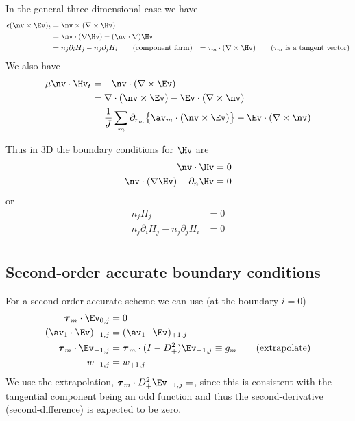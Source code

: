 \documentclass[10pt]{article}
\newcommand{\grad}{\nabla}
\begin{document}
In the general three-dimensional case we have
\begin{align*}
  \eps (\nv\times\Ev)_t &= \nv\times(\grad\times\Hv) \\
                   &= \nv\cdot(\grad\Hv) - (\nv\cdot\grad)\Hv \\
                   &= n_j \partial_i H_j - n_j \partial_j H_i \qquad\mbox{(component form)}
                   &= \tau_m\cdot(\grad\times\Hv) \qquad\mbox{($\tau_m$ is a tangent vector)}
\end{align*}
We also have
\begin{align*}
 \mu \nv\cdot\Hv_t & = -\nv\cdot(\grad\times\Ev) \\
                   &= \grad\cdot(\nv\times\Ev) - \Ev\cdot(\grad\times\nv) \\
                   &= {1\over J}\sum_m \partial_{r_m}\big\{ \av_m\cdot(\nv\times\Ev)\big\}
                                                  - \Ev\cdot(\grad\times\nv) \\
\end{align*}

Thus in 3D the boundary conditions for $\Hv$ are
\begin{align*} 
  \nv\cdot\Hv &= 0 \\
  \nv\cdot(\grad\Hv) - \partial_n \Hv &= 0
\end{align*}
or 
\begin{align*} 
  n_j H_j  &= 0 \\
  n_j \partial_i H_j - n_j \partial_j H_i &= 0 \\
\end{align*}

\subsection{Second-order accurate boundary conditions}

For a second-order accurate scheme we can use (at the boundary $i=0$)
\begin{align*}
    \tauv_m\cdot\Ev_{0,j}  &=0  \\
     (\av_1\cdot\Ev)_{-1,j} &= (\av_1\cdot\Ev)_{+1,j} \\
    \tauv_m\cdot\Ev_{-1,j} &= \tauv_m \cdot (I-D_+^2)\Ev_{-1,j} \equiv g_m   \qquad\mbox{(extrapolate)}\\
     w_{-1,j} &= w_{+1,j}
\end{align*}
We use the extrapolation, $\tauv_m\cdot D_+^2\Ev_{-1,j}=$, since this is consistent with the
tangential component being an odd function and thus the second-derivative (second-difference)
is expected to be zero.
\end{document}
